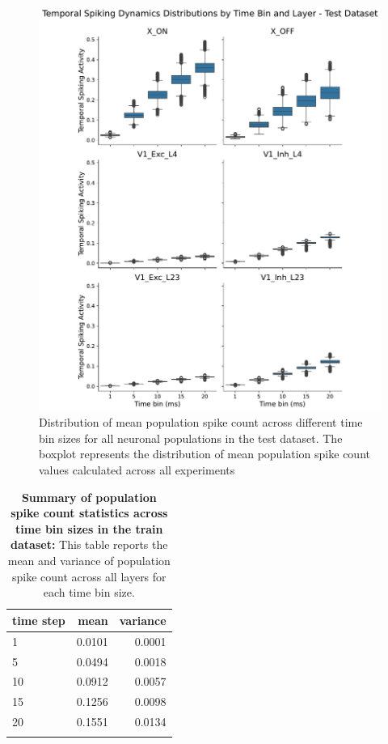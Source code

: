 \begin{figure}
    \centering
    \includegraphics[width=0.92\linewidth]{img/plots/synchrony_boxplot_time_bins_test.pdf}
    \caption{Distribution of mean population spike count across different time bin sizes for all neuronal populations in the test dataset. The boxplot represents the distribution of mean population spike count values calculated across all experiments}
    \label{fig:boxplot_synchrony_time_test}
\end{figure}

\begin{table}
    \centering\footnotesize\sf
    \begin{tabular}{lrr}
    \toprule
    time step & mean & variance \\
    \midrule
    1 & 0.0101 & 0.0001 \\
    5 & 0.0494 & 0.0018 \\
    10 & 0.0912 & 0.0057 \\
    15 & 0.1256 & 0.0098 \\
    20 & 0.1551 & 0.0134 \\
    \addlinespace %
    \bottomrule
    \end{tabular}
    \caption{\textbf{Summary of population spike count statistics across time bin sizes in the train dataset:} This table reports the mean and variance of population spike count across all layers for each time bin size.}
    \label{tab:synchrony_time_bins_summary_train}
\end{table}

